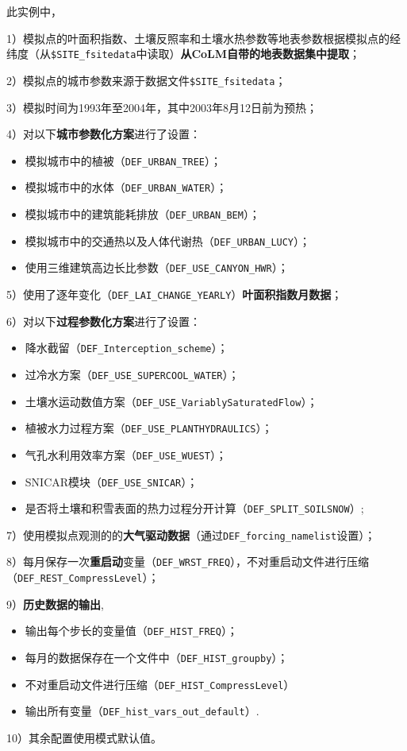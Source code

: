 此实例中，\par
1）模拟点的叶面积指数、土壤反照率和土壤水热参数等地表参数根据模拟点的经纬度（从\texttt{\$SITE\_fsitedata}中读取）\textbf{从CoLM自带的地表数据集中提取}；\par
2）模拟点的城市参数来源于数据文件\texttt{\$SITE\_fsitedata}；\par
3）模拟时间为1993年至2004年，其中2003年8月12日前为预热；\par
4）对以下\textbf{城市参数化方案}进行了设置：
\begin{itemize}[nosep,leftmargin=4em]
    \item 模拟城市中的植被（\texttt{DEF\_URBAN\_TREE}）；
    \item 模拟城市中的水体（\texttt{DEF\_URBAN\_WATER}）；
    \item 模拟城市中的建筑能耗排放（\texttt{DEF\_URBAN\_BEM}）；
    \item 模拟城市中的交通热以及人体代谢热（\texttt{DEF\_URBAN\_LUCY}）；
    \item 使用三维建筑高边长比参数（\texttt{DEF\_USE\_CANYON\_HWR}）；
\end{itemize} \par
5）使用了逐年变化（\texttt{DEF\_LAI\_CHANGE\_YEARLY}）\textbf{叶面积指数月数据}；\par
6）对以下\textbf{过程参数化方案}进行了设置：
\begin{itemize}[nosep,leftmargin=4em]
    \item 降水截留（\texttt{DEF\_Interception\_scheme}）；
    \item 过冷水方案（\texttt{DEF\_USE\_SUPERCOOL\_WATER}）；
    \item 土壤水运动数值方案（\texttt{DEF\_USE\_VariablySaturatedFlow}）；
    \item 植被水力过程方案（\texttt{DEF\_USE\_PLANTHYDRAULICS}）；
    \item 气孔水利用效率方案（\texttt{DEF\_USE\_WUEST}）；
    \item SNICAR模块（\texttt{DEF\_USE\_SNICAR}）；
    \item 是否将土壤和积雪表面的热力过程分开计算（\texttt{DEF\_SPLIT\_SOILSNOW}）;
\end{itemize}
\par
7）使用模拟点观测的的\textbf{大气驱动数据}（通过\texttt{DEF\_forcing\_namelist}设置）；\par
8）每月保存一次\textbf{重启动}变量（\texttt{DEF\_WRST\_FREQ}），不对重启动文件进行压缩（\texttt{DEF\_\allowbreak REST\_\allowbreak CompressLevel}）；\par
9）\textbf{历史数据的输出},
\begin{itemize}[nosep,leftmargin=4em]
    \item 输出每个步长的变量值（\texttt{DEF\_HIST\_FREQ}）；
    \item 每月的数据保存在一个文件中（\texttt{DEF\_HIST\_groupby}）；
    \item 不对重启动文件进行压缩（\texttt{DEF\_HIST\_CompressLevel}）
    \item 输出所有变量（\texttt{DEF\_hist\_vars\_out\_default}）.
\end{itemize} \par
10）其余配置使用模式默认值。

